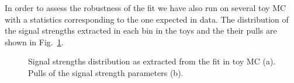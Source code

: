 In order to assess the robustness of the fit we have also run on several toy MC with a statistics corresponding to the one expected in data. The distribution of the signal strengths extracted in each bin in the toys and the their pulls are shown in Fig.~\ref{fig:pull_fit}. 
\begin{figure}[htb]
\centering
{}
\caption{Signal strengths distribution as extracted from the fit in toy MC (a). Pulls of the signal strength parameters (b).\label{fig:pull_fit}}
\end{figure}
